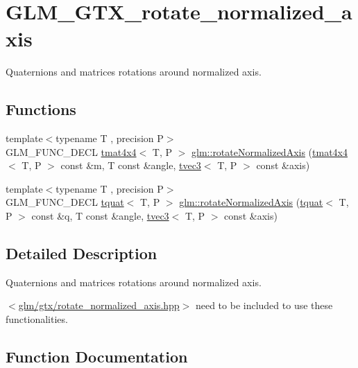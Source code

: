 \hypertarget{group__gtx__rotate__normalized__axis}{}\section{G\+L\+M\+\_\+\+G\+T\+X\+\_\+rotate\+\_\+normalized\+\_\+axis}
\label{group__gtx__rotate__normalized__axis}


Quaternions and matrices rotations around normalized axis.  


\subsection*{Functions}
\begin{DoxyCompactItemize}
\item 
{\footnotesize template$<$typename T , precision P$>$ }\\G\+L\+M\+\_\+\+F\+U\+N\+C\+\_\+\+D\+E\+CL \hyperlink{structglm_1_1tmat4x4}{tmat4x4}$<$ T, P $>$ \hyperlink{group__gtx__rotate__normalized__axis_gaada623964a895def5a8b77b5b7887dc4}{glm\+::rotate\+Normalized\+Axis} (\hyperlink{structglm_1_1tmat4x4}{tmat4x4}$<$ T, P $>$ const \&m, T const \&angle, \hyperlink{structglm_1_1tvec3}{tvec3}$<$ T, P $>$ const \&axis)
\item 
{\footnotesize template$<$typename T , precision P$>$ }\\G\+L\+M\+\_\+\+F\+U\+N\+C\+\_\+\+D\+E\+CL \hyperlink{structglm_1_1tquat}{tquat}$<$ T, P $>$ \hyperlink{group__gtx__rotate__normalized__axis_ga6c00234d844faef36a6a94669fbd1639}{glm\+::rotate\+Normalized\+Axis} (\hyperlink{structglm_1_1tquat}{tquat}$<$ T, P $>$ const \&q, T const \&angle, \hyperlink{structglm_1_1tvec3}{tvec3}$<$ T, P $>$ const \&axis)
\end{DoxyCompactItemize}


\subsection{Detailed Description}
Quaternions and matrices rotations around normalized axis. 

$<$\hyperlink{rotate__normalized__axis_8hpp}{glm/gtx/rotate\+\_\+normalized\+\_\+axis.\+hpp}$>$ need to be included to use these functionalities. 

\subsection{Function Documentation}
\mbox{\label{group__gtx__rotate__normalized__axis_gaada623964a895def5a8b77b5b7887dc4}} 
